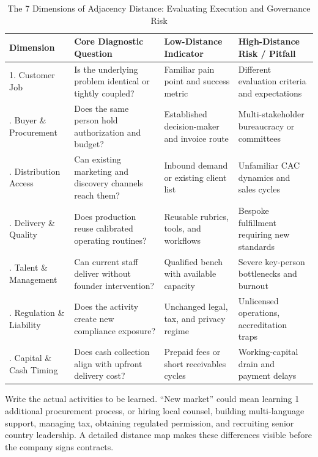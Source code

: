 \begin{table}[t]
\centering
\small
\caption{The 7 Dimensions of Adjacency Distance: Evaluating Execution and Governance Risk}
\label{tab:seven_dimensions_adjacency_distance}
\begin{tabularx}{\textwidth}{p{3.2cm} X p{3.6cm} p{3.8cm}}
\toprule
\textbf{Dimension} & \textbf{Core Diagnostic Question} & \textbf{Low-Distance Indicator} & \textbf{High-Distance Risk / Pitfall} \\
\midrule
1. Customer Job & Is the underlying problem identical or tightly coupled? & Familiar pain point and success metric & Different evaluation criteria and expectations \\
\addlinespace[2pt]
2. Buyer \& Procurement & Does the same person hold authorization and budget? & Established decision-maker and invoice route & Multi-stakeholder bureaucracy or committees \\
\addlinespace[2pt]
3. Distribution Access & Can existing marketing and discovery channels reach them? & Inbound demand or existing client list & Unfamiliar CAC dynamics and sales cycles \\
\addlinespace[2pt]
4. Delivery \& Quality & Does production reuse calibrated operating routines? & Reusable rubrics, tools, and workflows & Bespoke fulfillment requiring new standards \\
\addlinespace[2pt]
5. Talent \& Management & Can current staff deliver without founder intervention? & Qualified bench with available capacity & Severe key-person bottlenecks and burnout \\
\addlinespace[2pt]
6. Regulation \& Liability & Does the activity create new compliance exposure? & Unchanged legal, tax, and privacy regime & Unlicensed operations, accreditation traps \\
\addlinespace[2pt]
7. Capital \& Cash Timing & Does cash collection align with upfront delivery cost? & Prepaid fees or short receivables cycles & Working-capital drain and payment delays \\
\bottomrule
\end{tabularx}
\end{table}

Write the actual activities to be learned. ``New market'' could mean learning 1 additional procurement process, or hiring local counsel, building multi-language support, managing tax, obtaining regulated permission, and recruiting senior country leadership. A detailed distance map makes these differences visible before the company signs contracts.

